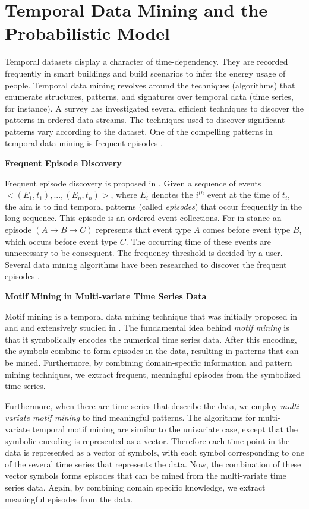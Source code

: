 \section{Temporal Data Mining and the Probabilistic Model}
Temporal datasets display a character of time-dependency. 
They are recorded frequently in smart buildings 
and build scenarios to infer the energy usage of people.
 Temporal data mining revolves around the techniques (algorithms) that enumerate structures, patterns, and signatures over temporal data (time series, for instance). 
 A survey \cite{laxman2006survey} has investigated several efficient 
 techniques to discover the patterns in ordered data streams.  
 The techniques used to discover significant patterns vary according to the dataset. 
 One of the compelling patterns in temporal data mining is frequent episodes \cite{mannila1997discovery}.

\textbf{Frequent Episode Discovery}

Frequent episode discovery is proposed in \cite{mannila1997discovery}. 
Given a sequence of events $<(E_1, t_1), ..., (E_n, t_n)>$, 
where $E_i$ denotes the $i^{th}$ event at the time of $t_i$, 
the aim is to find temporal patterns (called \textit{episodes}) that occur 
frequently in the long sequence. 
This episode is an ordered event collections. 
For in-stance an episode $(A\rightarrow B\rightarrow C)$ represents that event type $A$ comes before event type $B$, 
which occurs before event type $C$. 
The occurring time of these events are unnecessary to be consequent. 
The frequency threshold is decided by a user. 
 Several data mining algorithms have been researched to 
 discover the frequent episodes \cite{mannila1997discovery, laxman2005discovering}.
 
\textbf{Motif Mining in Multi-variate Time Series Data}

Motif mining is a temporal data mining technique that was initially proposed in ~\cite{motif1} and \cite{motif2} and extensively studied in \cite{minnen2007improving, tanaka2005discovery, motifgoal}. The fundamental idea behind \emph{motif mining} is that it symbolically encodes the numerical time series data. After this encoding, the symbols combine to form episodes in the data, resulting in patterns that can be mined. Furthermore, by combining domain-specific information and pattern mining techniques, we extract frequent,  meaningful episodes from the symbolized time series.

Furthermore, when there are time series that describe the data, we employ \emph{multi-variate motif mining} to find meaningful patterns. The algorithms for multi-variate temporal motif mining are similar to the univariate case, except that the symbolic encoding is represented as a vector. Therefore each time point in the data is represented as a vector of symbols, with each symbol corresponding to one of the several time series that represents the data. Now, the combination of these vector symbols forms episodes that can be mined from the multi-variate time series data. Again, by combining domain specific knowledge, we extract meaningful episodes from the data.